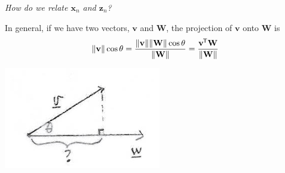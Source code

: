 \documentclass[11pt]{article}
\newcommand{\xb}{\mathbf{x}}
\newcommand{\zb}{\mathbf{z}}
\newcommand{\Wb}{\mathbf{W}}
\newcommand*{\tran}{^{\mkern-1.5mu\mathsf{T}}}
\begin{document}
\begin{minipage}{0.7 \textwidth}
  \textit{How do we relate $\xb_n$ and $\zb_n$?}

  In general, if we have two vectors,
  $\mathbf{v}$ and $\Wb$, the projection of $\mathbf{v}$ onto
  $\Wb$ is
  \begin{equation}
    \lVert \mathbf{v} \rVert \cos \theta =
    \frac{\lVert \mathbf{v} \rVert \lVert \Wb \rVert \cos \theta}
    {\lVert \Wb \rVert}
    = \frac{\mathbf{v}\tran\Wb}{\lVert \Wb \rVert}
    \label{eqn:projection}
  \end{equation}
\end{minipage}\hfill
\begin{minipage}{0.25 \textwidth}
\includegraphics[width=\textwidth]{Projection.png}
\end{minipage}
\end{document}

